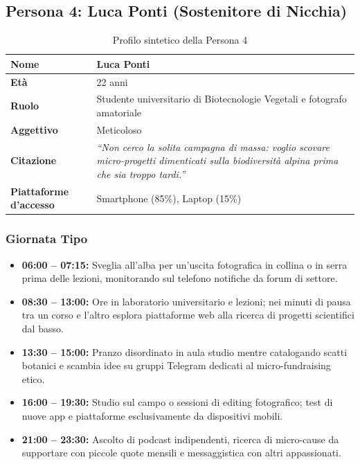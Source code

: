 \documentclass[11pt,a4paper]{article}
\begin{document}
\subsection{Persona 4: Luca Ponti (Sostenitore di Nicchia)}

\begin{table}[h!]
\centering
\small
\begin{tabular}{|p{3.5cm}|p{11.5cm}|}
\hline
\textbf{Nome} & Luca Ponti \\ \hline
\textbf{Età} & 22 anni \\ \hline
\textbf{Ruolo} & Studente universitario di Biotecnologie Vegetali e fotografo amatoriale \\ \hline
\textbf{Aggettivo} & Meticoloso \\ \hline
\textbf{Citazione} & \textit{``Non cerco la solita campagna di massa: voglio scovare micro-progetti dimenticati sulla biodiversità alpina prima che sia troppo tardi.''} \\ \hline
\textbf{Piattaforme d'accesso} & Smartphone (85\%), Laptop (15\%) \\ \hline
\end{tabular}
\caption{Profilo sintetico della Persona 4}
\label{tab:persona4}
\end{table}

\subsubsection{Giornata Tipo}
\begin{itemize}
    \item \textbf{06:00 -- 07:15:} Sveglia all'alba per un'uscita fotografica in collina o in serra prima delle lezioni, monitorando sul telefono notifiche da forum di settore.
    \item \textbf{08:30 -- 13:00:} Ore in laboratorio universitario e lezioni; nei minuti di pausa tra un corso e l'altro esplora piattaforme web alla ricerca di progetti scientifici dal basso.
    \item \textbf{13:30 -- 15:00:} Pranzo disordinato in aula studio mentre catalogando scatti botanici e scambia idee su gruppi Telegram dedicati al micro-fundraising etico.
    \item \textbf{16:00 -- 19:30:} Studio sul campo o sessioni di editing fotografico; test di nuove app e piattaforme esclusivamente da dispositivi mobili.
    \item \textbf{21:00 -- 23:30:} Ascolto di podcast indipendenti, ricerca di micro-cause da supportare con piccole quote mensili e messaggistica con altri appassionati.
\end{itemize}
\end{document}
